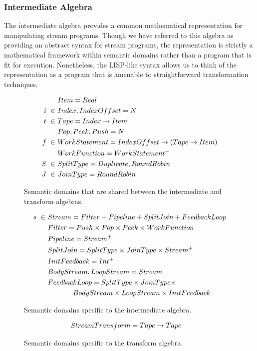 \subsubsection{Intermediate Algebra}
\label{sec:intalgebra}

The intermediate algebra provides a common mathematical representation
for manipulating stream programs.  Though we have referred to this
algebra as providing an abstract syntax for stream programs, the
representation is strictly a mathematical framework within semantic
domains rather than a program that is fit for execution.  Nonetheless,
the LISP-like syntax allows us to think of the representation as a
program that is amenable to straightforward transformation techniques.

\begin{figure}
\begin{align*}
&Item = Real \\
i~\in~&Index, IndexOffset = N \\
t~\in~&Tape = Index \rightarrow Item \\
&Pop, Peek, Push = N \\ 
f~\in~&WorkStatement = IndexOffset \rightarrow (Tape \rightarrow Item) \\ 
&WorkFunction = WorkStatement^{+} \\
S~\in~&SplitType = {Duplicate, RoundRobin} \\ 
J~\in~&JoinType = {RoundRobin}
\end{align*}
\vspace{-18pt}
\caption{Semantic domains that are shared between the intermediate and
  transform algebras.
\protect\label{fig:shareddom}}
\vspace{-6pt}
\begin{align*}
s~\in~&Stream = Filter + Pipeline + SplitJoin + FeedbackLoop \\
&Filter = Push \times Pop \times Peek \times WorkFunction \\
&Pipeline = Stream^{+} \\
&SplitJoin = SplitType \times JoinType \times Stream^{+} \\
&InitFeedback = Int^{+} \\
&BodyStream, LoopStream = Stream \\
&FeedbackLoop = SplitType \times JoinType \times \\
& \hspace{0.5in} BodyStream \times LoopStream \times InitFeedback
\end{align*}
\vspace{-18pt}
\caption{Semantic domains specific to the intermediate algebra.
\protect\label{fig:interdom}}
\vspace{-6pt}
\begin{align*}
&StreamTransform = Tape \rightarrow Tape
\end{align*}
\caption{Semantic domains specific to the transform algebra.
\protect\label{fig:transformdom}}
\end{figure}

